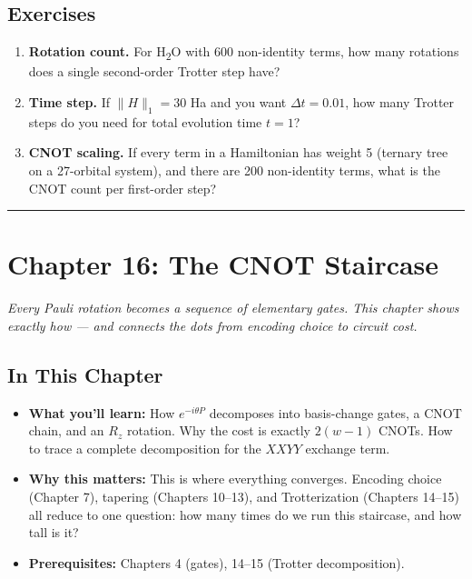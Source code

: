 \documentclass[
  11pt,
  oneside]{book}
\providecommand{\tightlist}{%
  \setlength{\itemsep}{0pt}\setlength{\parskip}{0pt}}
\begin{document}
\section{Exercises}\label{exercises-10}

\begin{enumerate}
\def\labelenumi{\arabic{enumi}.}
\item
  \textbf{Rotation count.} For H\textsubscript{2}O with 600 non-identity terms, how many
  rotations does a single second-order Trotter step have?
\item
  \textbf{Time step.} If \(\lVert H \rVert_1 = 30\) Ha and you want
  \(\Delta t = 0.01\), how many Trotter steps do you need for total
  evolution time \(t = 1\)?
\item
  \textbf{CNOT scaling.} If every term in a Hamiltonian has weight 5
  (ternary tree on a 27-orbital system), and there are 200 non-identity
  terms, what is the CNOT count per first-order step?
\end{enumerate}

\begin{center}\rule{0.5\linewidth}{0.5pt}\end{center}

\chapter{Chapter 16: The CNOT
Staircase}\label{chapter-16-the-cnot-staircase}

\emph{Every Pauli rotation becomes a sequence of elementary gates. This
chapter shows exactly how --- and connects the dots from encoding choice
to circuit cost.}

\section{In This Chapter}\label{in-this-chapter-15}

\begin{itemize}
\tightlist
\item
  \textbf{What you'll learn:} How \(e^{-i\theta P}\) decomposes into
  basis-change gates, a CNOT chain, and an \(R_z\) rotation. Why the
  cost is exactly \(2(w-1)\) CNOTs. How to trace a complete
  decomposition for the \(XXYY\) exchange term.
\item
  \textbf{Why this matters:} This is where everything converges.
  Encoding choice (Chapter 7), tapering (Chapters 10--13), and
  Trotterization (Chapters 14--15) all reduce to one question: how many
  times do we run this staircase, and how tall is it?
\item
  \textbf{Prerequisites:} Chapters 4 (gates), 14--15 (Trotter
  decomposition).
\end{itemize}
\end{document}
